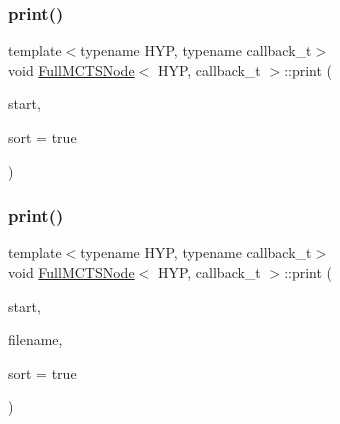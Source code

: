 \mbox{\label{class_full_m_c_t_s_node_a5e19a1daa58f5dd9bf0fee41527c1f0e}} 
\subsubsection{\texorpdfstring{print()}{print()}\hspace{0.1cm}{\footnotesize\ttfamily [2/3]}}
{\footnotesize\ttfamily template$<$typename H\+YP, typename callback\+\_\+t$>$ \\
void \hyperlink{class_full_m_c_t_s_node}{Full\+M\+C\+T\+S\+Node}$<$ H\+YP, callback\+\_\+t $>$\+::print (\begin{DoxyParamCaption}\item[{H\+YP \&}]{start,  }\item[{const bool}]{sort = {\ttfamily true} }\end{DoxyParamCaption})\hspace{0.3cm}{\ttfamily [inline]}}

\mbox{\label{class_full_m_c_t_s_node_afed4f436edc8b28876c1afc3f715d7f1}} 
\subsubsection{\texorpdfstring{print()}{print()}\hspace{0.1cm}{\footnotesize\ttfamily [3/3]}}
{\footnotesize\ttfamily template$<$typename H\+YP, typename callback\+\_\+t$>$ \\
void \hyperlink{class_full_m_c_t_s_node}{Full\+M\+C\+T\+S\+Node}$<$ H\+YP, callback\+\_\+t $>$\+::print (\begin{DoxyParamCaption}\item[{H\+YP \&}]{start,  }\item[{const char $\ast$}]{filename,  }\item[{const bool}]{sort = {\ttfamily true} }\end{DoxyParamCaption})\hspace{0.3cm}{\ttfamily [inline]}}

\mbox{\label{class_full_m_c_t_s_node_a99fd09625120aa0761f113bd44e5afff}} 
